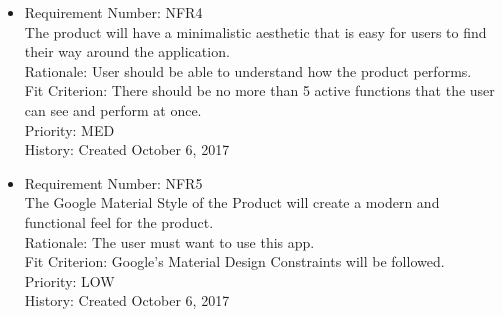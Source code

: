 \documentclass[12pt, titlepage]{article}
\begin{document}
\begin{itemize}
	\item Requirement Number: NFR4\\
The product will have a minimalistic aesthetic that is easy for users to find their way around the application.\\
Rationale: User should be able to understand how the product performs.\\
Fit Criterion: There should be no more than 5 active functions that the user can see and perform at once.\\
Priority: MED\\
History: Created October 6, 2017
	\item Requirement Number: NFR5\\
The Google Material Style of the Product will create a modern and functional feel for the product.\\
Rationale: The user must want to use this app.\\
Fit Criterion: Google’s Material Design Constraints will be followed.\\
Priority: LOW\\
History: Created October 6, 2017

\end{itemize}
\end{document}
